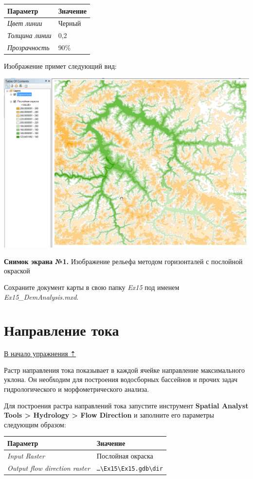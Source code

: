 \documentclass[12pt,]{book}
\begin{document}
\begin{enumerate}
  \begin{longtable}[]{@{}ll@{}}
  \toprule
  Параметр & Значение\tabularnewline
  \midrule
  \endhead
  \emph{Цвет линии} & Черный\tabularnewline
  \emph{Толщина линии} & 0,2\tabularnewline
  \emph{Прозрачность} & 90\%\tabularnewline
  \bottomrule
  \end{longtable}

  Изображение примет следующий вид:

  \includegraphics{images/Ex15/image10.png}
\end{enumerate}

\textbf{Снимок экрана №1.} Изображение рельефа методом горизонталей с послойной окраской

Сохраните документ карты в свою папку \emph{Ex15} под именем \emph{Ex15\_DemAnalysis.mxd}.

\hypertarget{dem-flowdir}{%
\section{Направление тока}\label{dem-flowdir}}

\protect\hyperlink{dem}{В начало упражнения ⇡}

Растр направления тока показывает в каждой ячейке направление максимального уклона. Он необходим для построения водосборных бассейнов и прочих задач гидрологического и морфометрического анализа.

Для построения растра направлений тока запустите инструмент \textbf{Spatial Analyst Tools \textgreater{} Hydrology \textgreater{} Flow Direction} и заполните его параметры следующим образом:

\begin{longtable}[]{@{}ll@{}}
\toprule
Параметр & Значение\tabularnewline
\midrule
\endhead
\emph{Input Raster} & Послойная окраска\tabularnewline
\emph{Output flow direction raster} & \texttt{\ldots{}\textbackslash{}Ex15\textbackslash{}Ex15.gdb\textbackslash{}dir}\tabularnewline
\bottomrule
\end{longtable}
\end{document}
